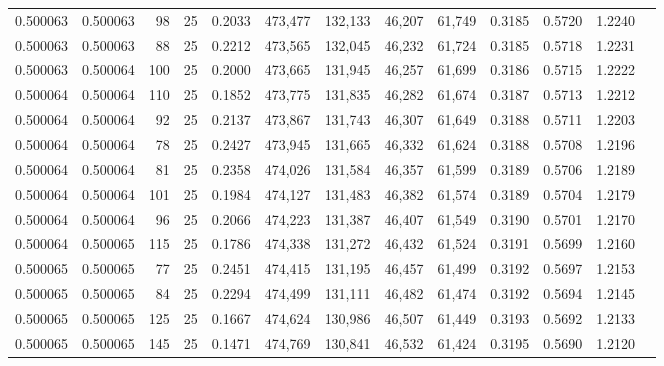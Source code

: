 \begin{tabular}{rrrrrrrrrrrrr}
0.500063 & 0.500063 &    98 &  25 &                                     0.2033 & 473,477 & 132,133 &  46,207 &  61,749 & 0.3185 & 0.5720 & 1.2240 \\
0.500063 & 0.500063 &    88 &  25 &                                     0.2212 & 473,565 & 132,045 &  46,232 &  61,724 & 0.3185 & 0.5718 & 1.2231 \\
0.500063 & 0.500064 &   100 &  25 &                                     0.2000 & 473,665 & 131,945 &  46,257 &  61,699 & 0.3186 & 0.5715 & 1.2222 \\
0.500064 & 0.500064 &   110 &  25 &                                     0.1852 & 473,775 & 131,835 &  46,282 &  61,674 & 0.3187 & 0.5713 & 1.2212 \\
0.500064 & 0.500064 &    92 &  25 &                                     0.2137 & 473,867 & 131,743 &  46,307 &  61,649 & 0.3188 & 0.5711 & 1.2203 \\
0.500064 & 0.500064 &    78 &  25 &                                     0.2427 & 473,945 & 131,665 &  46,332 &  61,624 & 0.3188 & 0.5708 & 1.2196 \\
0.500064 & 0.500064 &    81 &  25 &                                     0.2358 & 474,026 & 131,584 &  46,357 &  61,599 & 0.3189 & 0.5706 & 1.2189 \\
0.500064 & 0.500064 &   101 &  25 &                                     0.1984 & 474,127 & 131,483 &  46,382 &  61,574 & 0.3189 & 0.5704 & 1.2179 \\
0.500064 & 0.500064 &    96 &  25 &                                     0.2066 & 474,223 & 131,387 &  46,407 &  61,549 & 0.3190 & 0.5701 & 1.2170 \\
0.500064 & 0.500065 &   115 &  25 &                                     0.1786 & 474,338 & 131,272 &  46,432 &  61,524 & 0.3191 & 0.5699 & 1.2160 \\
0.500065 & 0.500065 &    77 &  25 &                                     0.2451 & 474,415 & 131,195 &  46,457 &  61,499 & 0.3192 & 0.5697 & 1.2153 \\
0.500065 & 0.500065 &    84 &  25 &                                     0.2294 & 474,499 & 131,111 &  46,482 &  61,474 & 0.3192 & 0.5694 & 1.2145 \\
0.500065 & 0.500065 &   125 &  25 &                                     0.1667 & 474,624 & 130,986 &  46,507 &  61,449 & 0.3193 & 0.5692 & 1.2133 \\
0.500065 & 0.500065 &   145 &  25 &                                     0.1471 & 474,769 & 130,841 &  46,532 &  61,424 & 0.3195 & 0.5690 & 1.2120 \\

\end{tabular}
